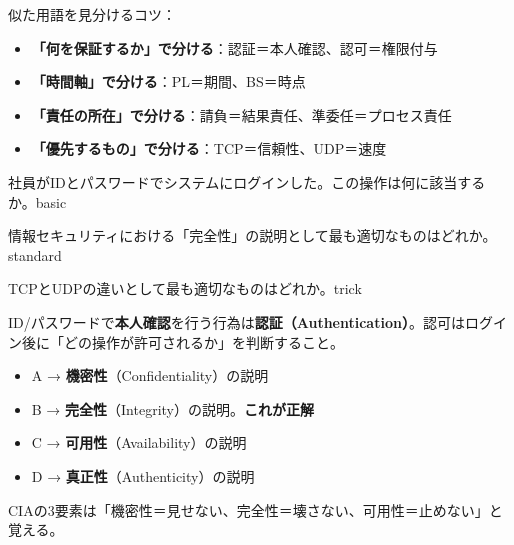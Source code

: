 \begin{keypoint}
似た用語を見分けるコツ：
\begin{itemize}
  \item \textbf{「何を保証するか」で分ける}：認証＝本人確認、認可＝権限付与
  \item \textbf{「時間軸」で分ける}：PL＝期間、BS＝時点
  \item \textbf{「責任の所在」で分ける}：請負＝結果責任、準委任＝プロセス責任
  \item \textbf{「優先するもの」で分ける}：TCP＝信頼性、UDP＝速度
\end{itemize}
\end{keypoint}


\begin{mondai}{社員がIDとパスワードでシステムにログインした。この操作は何に該当するか。}{basic}
\end{mondai}

\begin{mondai}{情報セキュリティにおける「完全性」の説明として最も適切なものはどれか。}{standard}
\end{mondai}

\begin{mondai}{TCPとUDPの違いとして最も適切なものはどれか。}{trick}
\end{mondai}

\kaitoupage


\begin{kaisetsu}
ID/パスワードで\textbf{本人確認}を行う行為は\textbf{認証（Authentication）}。認可はログイン後に「どの操作が許可されるか」を判断すること。
\end{kaisetsu}


\begin{goutoubun}
\begin{itemize}
  \item A → \textbf{機密性}（Confidentiality）の説明
  \item B → \textbf{完全性}（Integrity）の説明。\textbf{これが正解}
  \item C → \textbf{可用性}（Availability）の説明
  \item D → \textbf{真正性}（Authenticity）の説明
\end{itemize}
CIAの3要素は「機密性＝見せない、完全性＝壊さない、可用性＝止めない」と覚える。
\end{goutoubun}

